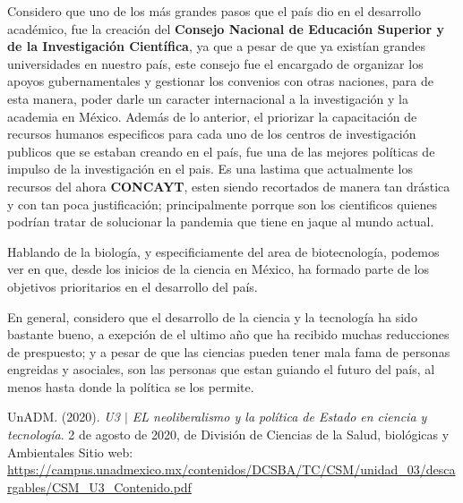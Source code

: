 \documentclass[12pt]{article}
\begin{document}
	\par Considero que uno de los m\'as grandes pasos que el pa\'is dio en el desarrollo acad\'emico, fue la creaci\'on del \textbf{Consejo Nacional de Educación Superior y de la Investigación Científica}, ya que a pesar de que ya exist\'ian grandes universidades en nuestro pa\'is, este consejo fue el encargado de organizar los apoyos gubernamentales y gestionar los convenios con otras naciones, para de esta manera, poder darle un caracter internacional a la investigaci\'on y la academia en M\'exico. Adem\'as de lo anterior, el priorizar la capacitaci\'on de recursos humanos especificos para cada uno de los centros de investigaci\'on publicos que se estaban creando en el pa\'is, fue una de las  mejores pol\'iticas de impulso de la investigaci\'on en el pais. Es una lastima que actualmente los recursos del ahora \textbf{CONCAYT}, esten siendo recortados de manera tan dr\'astica y con tan poca justificaci\'on; principalmente porrque son los cientificos quienes podr\'ian tratar de solucionar la pandemia que tiene en jaque al mundo actual.
	
	\par Hablando de la biolog\'ia, y especificiamente del area de biotecnolog\'ia, podemos ver en \cite[p\'ag 35]{basica} que, desde los inicios de la ciencia en M\'exico, ha formado parte de los objetivos prioritarios en el desarrollo del pa\'is.
	
	\par En general, considero que el desarrollo de la ciencia y la tecnolog\'ia ha sido bastante bueno, a exepci\'on de el ultimo a\~no que ha recibido muchas reducciones de prespuesto; y a pesar de que las ciencias pueden tener mala fama de personas engreidas y asociales, son las personas que estan guiando el futuro del pa\'is, al menos hasta donde la pol\'itica se los permite.
	

\noindent\makebox[\linewidth]{\rule{\paperwidth}{0.4pt}}
\begin{thebibliography}{X}
	 UnADM. (2020). \textit{U3 $|$ EL neoliberalismo y la política de Estado en ciencia y tecnología}. 2 de agosto de 2020, de División de Ciencias de la Salud, biológicas y Ambientales Sitio web: \url{https://campus.unadmexico.mx/contenidos/DCSBA/TC/CSM/unidad_03/descargables/CSM_U3_Contenido.pdf}
\end{thebibliography}
\end{document}
